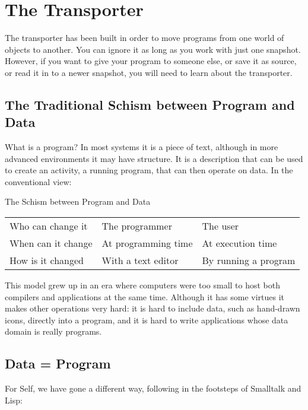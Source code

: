 \documentclass[letterpaper,10pt,english]{sphinxmanual}
\begin{document}
\section{The Transporter}
\label{\detokenize{howtoprg:the-transporter}}
The transporter has been built in order to move programs from one world of objects to another. You can
ignore it as long as you work with just one snapshot. However, if you want to give your
program to someone else, or save it as source, or read it in to a newer snapshot, you will need to
learn about the transporter.


\subsection{The Traditional Schism between Program and Data}
\label{\detokenize{howtoprg:the-traditional-schism-between-program-and-data}}
What is a program? In most systems it is a piece of text, although in more advanced environments
it may have structure. It is a description that can be used to create an activity, a running program,
that can then operate on data. In the conventional view:


\begin{threeparttable}
\capstart\caption{The Schism between Program and Data}\label{\detokenize{howtoprg:id19}}
\noindent\begin{tabulary}{\linewidth}{|L|L|L|}
\hline
\sphinxstylethead{\relax \unskip}\relax &\relax &\relax \\
\hline
Who can change it
&
The programmer
&
The user
\\
\hline
When can it change
&
At programming time
&
At execution time
\\
\hline
How is it changed
&
With a text editor
&
By running a program
\\
\hline\end{tabulary}

\end{threeparttable}


This model grew up in an era where computers were too small to host both compilers and applications
at the same time. Although it has some virtues it makes other operations very hard: it is hard
to include data, such as hand-drawn icons, directly into a program, and it is hard to write applications
whose data domain is really programs.


\subsection{Data = Program}
\label{\detokenize{howtoprg:data-program}}
For Self, we have gone a different way, following in the footsteps of Smalltalk and Lisp:
\begin{quote}

\end{quote}
\end{document}

